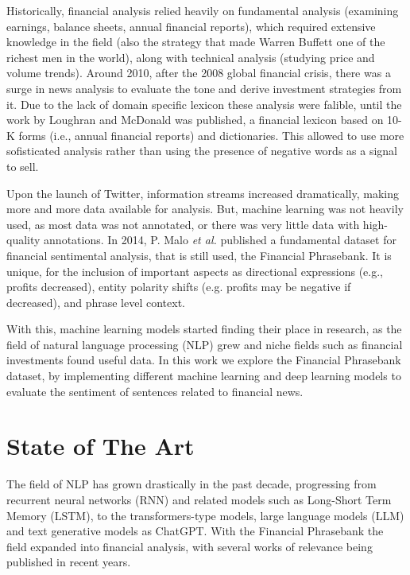 \documentclass[conference]{IEEEtran}
\begin{document}
Historically, financial analysis relied heavily on fundamental analysis (examining earnings, balance sheets, annual financial reports), which required extensive knowledge in the field (also the strategy that made Warren Buffett one of the richest men in the world), along with technical analysis (studying price and volume trends). Around 2010, after the 2008 global financial crisis, there was a surge in news analysis to evaluate the tone and derive investment strategies from it. Due to the lack of domain specific lexicon these analysis were falible, until the work by Loughran and McDonald was published, a financial lexicon based on 10-K forms (i.e., annual financial reports) and dictionaries. This allowed to use more sofisticated analysis rather than using the presence of negative words as a signal to sell.

Upon the launch of Twitter, information streams increased dramatically, making more and more data available for analysis. But, machine learning was not heavily used, as most data was not annotated, or there was very little data with high-quality annotations. In 2014, P. Malo \textit{et al.} published a fundamental dataset for financial sentimental analysis, that is still used, the Financial Phrasebank. It is unique, for the inclusion of important aspects as directional expressions (e.g., profits decreased), entity polarity shifts (e.g. profits may be negative if decreased), and phrase level context.

With this, machine learning models started finding their place in research, as the field of natural language processing (NLP) grew and niche fields such as financial investments found useful data. In this work we explore the Financial Phrasebank dataset, by implementing different machine learning and deep learning models to evaluate the sentiment of sentences related to financial news.

\section{State of The Art}

The field of NLP has grown drastically in the past decade, progressing from recurrent neural networks (RNN) and related models such as Long-Short Term Memory (LSTM), to the transformers-type models, large language models (LLM) and text generative models as ChatGPT. With the Financial Phrasebank the field expanded into financial analysis, with several works of relevance being published in recent years.
\end{document}
